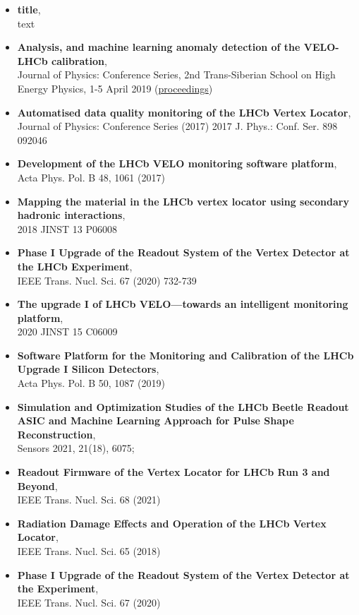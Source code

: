 \begin{itemize}

  \item \textbf{title},
        \\ text
  \item \textbf{Analysis, and machine learning anomaly detection of the VELO-LHCb calibration},
        \\ Journal of Physics: Conference Series, 2nd Trans-Siberian School on High Energy Physics, 1-5 April 2019 (\href{https://doi.org/10.1088/1742-6596/1337/1/012006}{proceedings})

  \item \textbf{Automatised data quality monitoring of the LHCb Vertex Locator},
        \\ Journal of Physics: Conference Series (2017) 2017 J. Phys.: Conf. Ser. 898 092046

  \item \textbf{Development of the LHCb VELO monitoring software platform},
        \\ Acta Phys. Pol. B 48, 1061 (2017)

  \item \textbf{Mapping the material in the LHCb vertex locator using secondary hadronic interactions},
        \\ 2018 JINST 13 P06008

  \item \textbf{Phase I Upgrade of the Readout System of the Vertex Detector at the LHCb Experiment},
        \\ IEEE Trans. Nucl. Sci. 67 (2020) 732-739

  \item \textbf{The upgrade I of LHCb VELO—towards an intelligent monitoring platform},
        \\ 2020 JINST 15 C06009

  \item \textbf{Software Platform for the Monitoring and Calibration of the LHCb Upgrade I Silicon Detectors},
        \\ Acta Phys. Pol. B 50, 1087 (2019)

  \item \textbf{Simulation and Optimization Studies of the LHCb Beetle Readout ASIC and Machine Learning Approach for Pulse Shape Reconstruction},
        \\ Sensors 2021, 21(18), 6075;
  \item \textbf{Readout Firmware of the Vertex Locator for LHCb Run 3 and Beyond},
        \\ IEEE Trans. Nucl. Sci. 68 (2021)
  \item \textbf{Radiation Damage Effects and Operation of the LHCb Vertex Locator},
        \\ IEEE Trans. Nucl. Sci. 65 (2018)
  \item \textbf{Phase I Upgrade of the Readout System of the Vertex Detector at the Experiment},
        \\ IEEE Trans. Nucl. Sci. 67 (2020)
\end{itemize}

